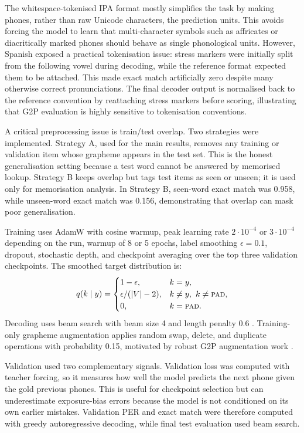 \documentclass[11pt]{article}
\begin{document}
The whitespace-tokenised IPA format mostly simplifies the task by making phones,
rather than raw Unicode characters, the prediction units. This avoids forcing
the model to learn that multi-character symbols such as affricates or
diacritically marked phones should behave as single phonological units. However,
Spanish exposed a practical tokenisation issue: stress markers were initially
split from the following vowel during decoding, while the reference format
expected them to be attached. This made exact match artificially zero despite
many otherwise correct pronunciations. The final decoder output is normalised
back to the reference convention by reattaching stress markers before scoring,
illustrating that G2P evaluation is highly sensitive to tokenisation
conventions.

A critical preprocessing issue is train/test overlap. Two strategies were
implemented. Strategy A, used for the main results, removes any training or
validation item whose grapheme appears in the test set. This is the honest
generalisation setting because a test word cannot be answered by memorised
lookup. Strategy B keeps overlap but tags test items as seen or unseen; it is
used only for memorisation analysis. In Strategy B, seen-word exact match was
0.958, while unseen-word exact match was 0.156, demonstrating that overlap can
mask poor generalisation.

Training uses AdamW with cosine warmup, peak learning rate $2\cdot10^{-4}$ or
$3\cdot10^{-4}$ depending on the run, warmup of 8 or 5 epochs, label smoothing
$\epsilon=0.1$, dropout, stochastic depth, and checkpoint averaging over the
top three validation checkpoints. The smoothed target distribution is:
\begin{equation}
\label{eq:ls}
q(k\mid y)=
\begin{cases}
1-\epsilon, & k=y,\\
\epsilon/(|V|-2), & k\neq y,\ k\neq \textsc{pad},\\
0, & k=\textsc{pad}.
\end{cases}
\end{equation}
Decoding uses beam search with beam size 4 and length penalty 0.6
\citep{wu2016gnmt}. Training-only grapheme augmentation applies random swap,
delete, and duplicate operations with probability 0.15, motivated by robust G2P
augmentation work \citep{zhao2022rg2p}.

Validation used two complementary signals. Validation loss was computed with
teacher forcing, so it measures how well the model predicts the next phone given
the gold previous phones. This is useful for checkpoint selection but can
underestimate exposure-bias errors because the model is not conditioned on its
own earlier mistakes. Validation PER and exact match were therefore computed
with greedy autoregressive decoding, while final test evaluation used beam
search.
\end{document}
